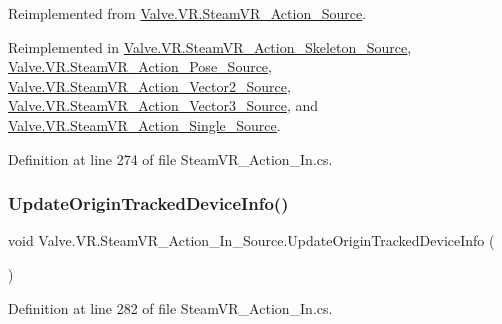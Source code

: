 Reimplemented from \mbox{\hyperlink{class_valve_1_1_v_r_1_1_steam_v_r___action___source_aa4784c092cc0a4372812834bfcceab6d}{Valve.\+V\+R.\+Steam\+V\+R\+\_\+\+Action\+\_\+\+Source}}.



Reimplemented in \mbox{\hyperlink{class_valve_1_1_v_r_1_1_steam_v_r___action___skeleton___source_af437a90257ecb494eb2c0b77747fe9d4}{Valve.\+V\+R.\+Steam\+V\+R\+\_\+\+Action\+\_\+\+Skeleton\+\_\+\+Source}}, \mbox{\hyperlink{class_valve_1_1_v_r_1_1_steam_v_r___action___pose___source_ab25a681f8310683a3c6695973041acc0}{Valve.\+V\+R.\+Steam\+V\+R\+\_\+\+Action\+\_\+\+Pose\+\_\+\+Source}}, \mbox{\hyperlink{class_valve_1_1_v_r_1_1_steam_v_r___action___vector2___source_a0633b07e1292cf9a235cf51f7cb117e8}{Valve.\+V\+R.\+Steam\+V\+R\+\_\+\+Action\+\_\+\+Vector2\+\_\+\+Source}}, \mbox{\hyperlink{class_valve_1_1_v_r_1_1_steam_v_r___action___vector3___source_a81f16a2652a419128d21fb861cd41112}{Valve.\+V\+R.\+Steam\+V\+R\+\_\+\+Action\+\_\+\+Vector3\+\_\+\+Source}}, and \mbox{\hyperlink{class_valve_1_1_v_r_1_1_steam_v_r___action___single___source_a4f9479769ac075b66ff50f2840db44c2}{Valve.\+V\+R.\+Steam\+V\+R\+\_\+\+Action\+\_\+\+Single\+\_\+\+Source}}.



Definition at line 274 of file Steam\+V\+R\+\_\+\+Action\+\_\+\+In.\+cs.

\mbox{\label{class_valve_1_1_v_r_1_1_steam_v_r___action___in___source_a2f6dd3258b69ad2d7907dd35460ed4d9}} 
\subsubsection{\texorpdfstring{UpdateOriginTrackedDeviceInfo()}{UpdateOriginTrackedDeviceInfo()}}
{\footnotesize\ttfamily void Valve.\+V\+R.\+Steam\+V\+R\+\_\+\+Action\+\_\+\+In\+\_\+\+Source.\+Update\+Origin\+Tracked\+Device\+Info (\begin{DoxyParamCaption}{ }\end{DoxyParamCaption})\hspace{0.3cm}{\ttfamily [protected]}}



Definition at line 282 of file Steam\+V\+R\+\_\+\+Action\+\_\+\+In.\+cs.


